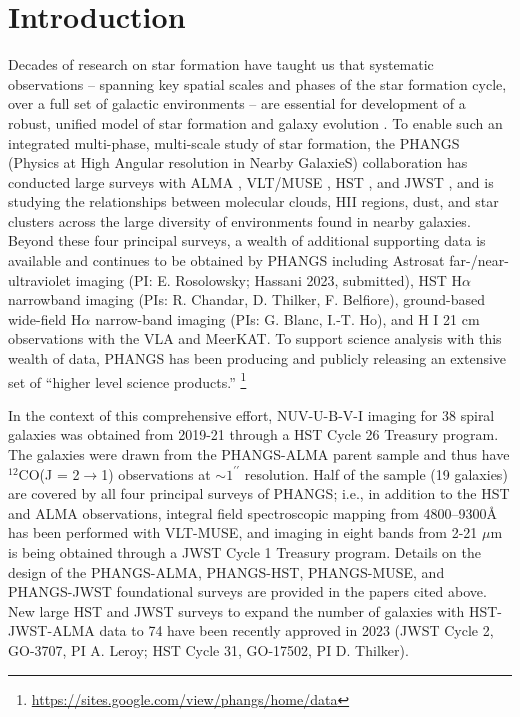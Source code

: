 \documentclass[linenumbers]{aastex63}
\begin{document}
\section{Introduction}\label{sec:intro}
Decades of research on star formation have taught us that systematic observations – spanning key spatial scales and phases of the star formation cycle, over a full set of galactic environments – are essential for development of a robust, unified model of star formation and galaxy evolution \citep[e.g.][]{kennicutt_star_2012}.  To enable such an integrated multi-phase, multi-scale study of star formation, the PHANGS (Physics at High Angular resolution in Nearby GalaxieS) collaboration \citep{schinnerer_physics_2019} has conducted large surveys with ALMA \citep{leroy_phangs-alma_2021}, VLT/MUSE \citep{emsellem_phangs-muse_2022}, HST \citep{lee_phangs-hst_2022}, and JWST \citep{lee_phangs-jwst_2023}, and is studying the relationships between molecular clouds, HII regions, dust, and star clusters across the large diversity of environments found in nearby galaxies. Beyond these four principal surveys, a wealth of additional supporting data is available and continues to be obtained by PHANGS including Astrosat far-/near-ultraviolet imaging (PI: E. Rosolowsky; Hassani 2023, submitted), HST H$\alpha$ narrowband imaging (PIs: R. Chandar, D. Thilker, F. Belfiore), ground-based wide-field H$\alpha$ narrow-band imaging (PIs: G. Blanc, I.-T. Ho), and H I 21 cm observations with the VLA and MeerKAT.  To support science analysis with this wealth of data, PHANGS has been producing and publicly releasing
an extensive set of ``higher level science products.'' \footnote{\url{https://sites.google.com/view/phangs/home/data}}

In the context of this comprehensive effort, NUV-U-B-V-I imaging for 38 spiral galaxies was obtained from 2019-21 through a HST Cycle 26 Treasury program.  The galaxies were drawn from the PHANGS-ALMA parent sample and thus have $^{12}$CO(J = 2$\rightarrow$1) observations at $\sim1^{\prime\prime}$ resolution.  Half of the sample (19 galaxies) are covered by all four principal surveys of PHANGS; i.e., in addition to the HST and ALMA observations, integral field spectroscopic mapping from 4800–9300\AA\, has been performed with VLT-MUSE, and imaging in eight bands from 2-21 $\mu$m is being obtained through a JWST Cycle 1 Treasury program.  Details on the design of the PHANGS-ALMA, PHANGS-HST, PHANGS-MUSE, and PHANGS-JWST foundational surveys are provided in the papers cited above.  New large HST and JWST surveys to expand the number of galaxies with HST-JWST-ALMA data to 74 have been recently approved in 2023 (JWST Cycle 2, GO-3707, PI A. Leroy; HST Cycle 31, GO-17502, PI D. Thilker).
\end{document}
